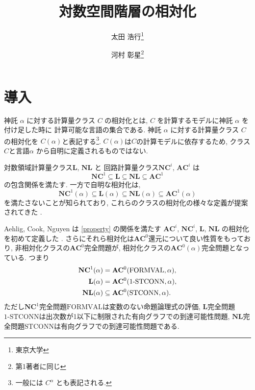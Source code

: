 \documentclass[11pt,a4paper]{jsarticle}
\title{対数空間階層の相対化}
\author{太田 浩行\thanks{東京大学} \and
河村 彰星\thanks{第1著者に同じ}
}
\date{}
\theoremstyle{definition}
\theoremstyle{remark}
\newcommand{\classfont}{\mathbf}
\newcommand{\AC}{\classfont{AC}}
\newcommand{\NC}{\classfont{NC}}
\renewcommand{\L}{\classfont{L}}
\newcommand{\NL}{\classfont{NL}}
\newcommand{\probfont}{\text}
\newcommand{\oneSTCONN}{\probfont{1-STCONN}}
\newcommand{\STCONN}{\probfont{STCONN}}
\newcommand{\FORMVAL}{\probfont{FORMVAL}}
\begin{document}
\maketitle



\section{導入}
神託 $\alpha$ に対する計算量クラス $C$ の相対化とは,
$C$ を計算するモデルに神託 $\alpha$ を付け足した時に
計算可能な言語の集合である.
神託 $\alpha$ に対する計算量クラス $C$ の相対化を
$C(\alpha)$と表記する\footnote{一般には $C^\alpha$ とも表記される.}.
$C(\alpha)$は$C$の計算モデルに依存するため, クラス$C$と言語$\alpha$
から自明に定義されるものではない.

対数領域計算量クラス$\L$, $\NL$ と
回路計算量クラス$\NC^i$, $\AC^i$ は
\begin{equation*}
 \NC^1 \subseteq \L \subseteq \NL \subseteq \AC^1
\end{equation*}
の包含関係を満たす.
一方で自明な相対化は,
\begin{equation}
 \NC^1(\alpha) \subseteq \L(\alpha) \subseteq \NL(\alpha) \subseteq \AC^1(\alpha) \label{property}
\end{equation}
を満たさないことが知られており,
これらのクラスの相対化の様々な定義が提案されてきた
\cite{aehlig2007relativizing,buss1988relativized,ladner1976relativization,wilson1988measure}.


Aehlig, Cook, Nguyen は \eqref{property} の関係を満たす
$\AC^i$, $\NC^i$, $\L$, $\NL$ の相対化を初めて定義した
\cite{aehlig2007relativizing}.
さらにそれら相対化は$\AC^0$還元について良い性質をもっており,
非相対化クラスの$\AC^0$完全問題が,
相対化クラスの$\AC^0(\alpha)$完全問題となっている. つまり
\begin{align}
 \NC^1(\alpha) &= \AC^0 (\FORMVAL, \alpha), \notag
 \\
 \L(\alpha) &= \AC^0 (\oneSTCONN, \alpha), \label{eq:nl-in-ac0-stconn}
 \\
 \NL(\alpha) &\subseteq \AC^0(\STCONN, \alpha). \notag
\end{align}
ただし$\NC^1$完全問題$\FORMVAL$は変数のない命題論理式の評価,
$\L$完全問題$\oneSTCONN$は出次数が1以下に制限された有向グラフでの到達可能性問題,
$\NL$完全問題$\STCONN$は有向グラフでの到達可能性問題である.
\end{document}
